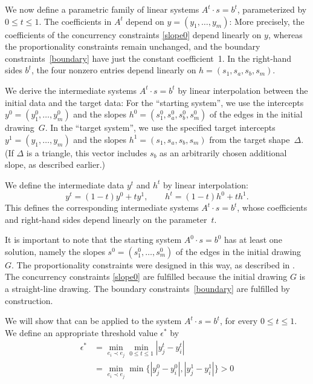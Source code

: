 We now define a parametric family of linear systems
 $A^t\cdot s = b^t$, parameterized by $0\le t\le 1$.
 The coefficients
 in $A^t$
 depend on $y=(y_1,\ldots,y_m)$:
 More precisely, the coefficients of the
 concurrency constraints
 \eqref{slope0} depend linearly on $y$,
 whereas
 the
 proportionality constraints 
 \thetag{\ref{eq:proportion}--\ref{eq:proportion2}} remain unchanged,
 and the boundary constraints~\eqref{boundary} have just the constant coefficient~1.
In the right-hand sides $b^t$,
the four nonzero entries
depend linearly on %
$h=(s_1,s_a,s_b,s_m)$.

We derive the intermediate systems 
$A^t\cdot s = b^t$ by linear interpolation between the initial data
and the target data:
For the ``starting system'', we use
the intercepts
 $y^0=(y_1^0,\ldots,y_m^0)$
 and the slopes
 $h^0=(s_1^0,s_a^0,s_b^0,s_m^0)$
 of the edges in the initial drawing~$G$.
In the ``target system'', we use
the specified target intercepts
 $y^1=(y_1,\ldots,y_m)$
 and the slopes
 $h^1=(s_1,s_a,s_b,s_m)$ from the target shape~$\Delta$.
(If $\Delta$ is a triangle, this vector includes $s_b$ as an arbitrarily chosen
additional slope, as described earlier.)

 
We define the intermediate data $y^t$ and $h^t$
by linear interpolation:
\begin{equation*}
  y^t = (1-t)y^0 + ty^1,
  \qquad
  h^t = (1-t)h^0 + th^1.
\end{equation*}
This defines the corresponding intermediate systems 
$A^t\cdot s = b^t$, whose coefficients and right-hand sides depend
linearly on the parameter~$t$.

It is important to note that
the starting system
$A^0\cdot s = b^0$
has at least one solution, %
namely the slopes
$s^0=(s_1^0,\ldots,s_m^0)$
 of the edges in the initial drawing $G$.
 The proportionality constraints
  \thetag{\ref{eq:proportion}--\ref{eq:proportion2}} were designed
  in this way, as described in .
 The
 concurrency constraints
 \eqref{slope0} are fulfilled because the initial drawing $G$ is a
 straight-line drawing.
 The boundary constraints~\eqref{boundary} are fulfilled by
 construction.



We will show that  can be applied to the
system $A^t\cdot s=b^t$, for every $0\le t\le 1$. We define
an appropriate threshold value $  \epsilon^*$ by
\begin{align*}
  \epsilon^*&
              =
              \min_{e_i\prec e_j}  
              \min_{0\le t\le 1}
              |y_j^t-y_i^t| %
 \\            &
              =%
              \min_{e_i\prec e_j}  
              \min\{|y_j^0-y_i^0|,|y_j^1-y_i^1|\}%
              > 0
\end{align*}






